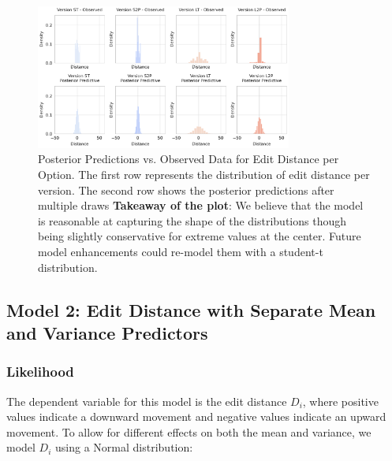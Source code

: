\begin{figure}[h!]
    \centering
    \includegraphics[width=0.75\textwidth]{content/image/distance/observed_vs_posterior_predictive_histogram_m2.pdf}
    \caption{Posterior Predictions vs. Observed Data for Edit Distance per Option. The first row represents the distribution of edit distance per version. The second row shows the posterior predictions after multiple draws \textbf{Takeaway of the plot}: We believe that the model is reasonable at capturing the shape of the distributions though being slightly conservative for extreme values at the center. Future model enhancements could re-model them with a student-t distribution.}

    \label{fig:observed_vs_posterior_predictive_histogram_m2}
\end{figure}

\subsection{Model 2: Edit Distance with Separate Mean and Variance Predictors} \label{sec:apdx:model_distance_variance}

\subsubsection{Likelihood}
The dependent variable for this model is the edit distance $D_i$, where positive values indicate a downward movement and negative values indicate an upward movement. To allow for different effects on both the mean and variance, we model $D_i$ using a Normal distribution:

